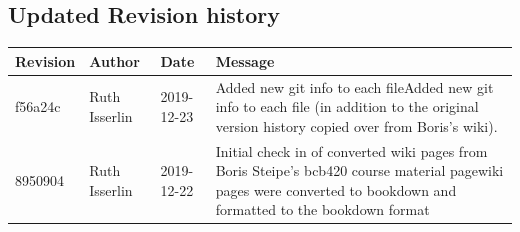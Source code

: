 \documentclass[]{book}
\begin{document}
\subsection{Updated Revision history}\label{updated-revision-history-6}

\begin{tabular}{l|l|l|l}
\hline
Revision & Author & Date & Message\\
\hline
f56a24c & Ruth Isserlin & 2019-12-23 & Added new git info to each fileAdded new git info to each file (in addition to the original version history copied over from Boris's wiki).\\
\hline
8950904 & Ruth Isserlin & 2019-12-22 & Initial check in of converted wiki pages from Boris Steipe's bcb420 course material pagewiki pages were converted to bookdown and formatted to the bookdown format\\
\hline
\end{tabular}
\end{document}
